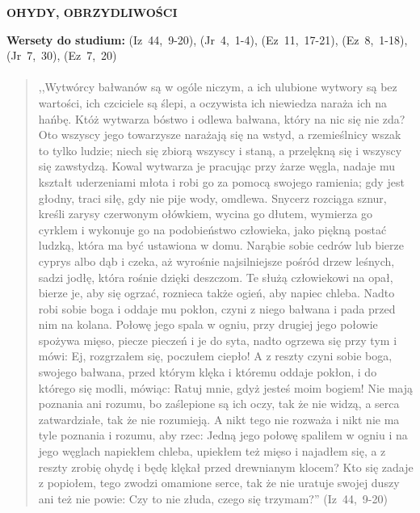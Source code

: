 \documentclass[10pt,a4paper,oneside]{article}
\begin{document}
\centerline{\textbf{\MakeUppercase{Ohydy, obrzydliwości}}}
\begin{center}
\textbf{Wersety do studium:} 
\mbox{(Iz 44, 9-20)}, \mbox{(Jr 4, 1-4)}, \mbox{(Ez 11, 17-21)}, \mbox{(Ez 8, 1-18)}, \mbox{(Jr 7, 30)}, \mbox{(Ez 7, 20)}
\end{center}
\paragraph{}
\begin{quote}
,,Wytwórcy bałwanów są w ogóle niczym, a ich ulubione wytwory są bez wartości, ich czciciele są ślepi, a oczywista ich niewiedza naraża ich na hańbę. Któż wytwarza bóstwo i odlewa bałwana, który na nic się nie zda? Oto wszyscy jego towarzysze narażają się na wstyd, a rzemieślnicy wszak to tylko ludzie; niech się zbiorą wszyscy i staną, a przelękną się i wszyscy się zawstydzą. Kowal wytwarza je pracując przy żarze węgla, nadaje mu kształt uderzeniami młota i robi go za pomocą swojego ramienia; gdy jest głodny, traci siłę, gdy nie pije wody, omdlewa. Snycerz rozciąga sznur, kreśli zarysy czerwonym ołówkiem, wycina go dłutem, wymierza go cyrklem i wykonuje go na podobieństwo człowieka, jako piękną postać ludzką, która ma być ustawiona w domu. Narąbie sobie cedrów lub bierze cyprys albo dąb i czeka, aż wyrośnie najsilniejsze pośród drzew leśnych, sadzi jodłę, która rośnie dzięki deszczom. Te służą człowiekowi na opał, bierze je, aby się ogrzać, roznieca także ogień, aby napiec chleba. Nadto robi sobie boga i oddaje mu pokłon, czyni z niego bałwana i pada przed nim na kolana. Połowę jego spala w ogniu, przy drugiej jego połowie spożywa mięso, piecze pieczeń i je do syta, nadto ogrzewa się przy tym i mówi: Ej, rozgrzałem się, poczułem ciepło! A z reszty czyni sobie boga, swojego bałwana, przed którym klęka i któremu oddaje pokłon, i do którego się modli, mówiąc: Ratuj mnie, gdyż jesteś moim bogiem! Nie mają poznania ani rozumu, bo zaślepione są ich oczy, tak że nie widzą, a serca zatwardziałe, tak że nie rozumieją. A nikt tego nie rozważa i nikt nie ma tyle poznania i rozumu, aby rzec: Jedną jego połowę spaliłem w ogniu i na jego węglach napiekłem chleba, upiekłem też mięso i najadłem się, a z reszty zrobię ohydę i będę klękał przed drewnianym klocem? Kto się zadaje z popiołem, tego zwodzi omamione serce, tak że nie uratuje swojej duszy ani też nie powie: Czy to nie złuda, czego się trzymam?'' \mbox{(Iz 44, 9-20)}
\end{quote}
\end{document}
